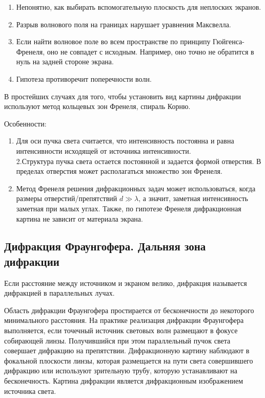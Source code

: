 \begin{enumerate} 
  \item Непонятно, как выбирать вспомогательную плоскость для неплоских экранов.
  
  \item Разрыв волнового поля на границах нарушает уравнения Максвелла.
  
  \item Если найти волновое поле во всем пространстве по принципу Гюйгенса-Френеля, оно не совпадет с исходным. Например, оно точно не обратится в нуль на задней стороне экрана.
  
  \item Гипотеза противоречит поперечности волн.
\end{enumerate}
В простейших случаях для того, чтобы установить вид картины дифракции используют метод кольцевых зон Френеля, спираль Корню. 

Особенности:

\begin{enumerate}
	\item Для оси пучка света считается, что интенсивность постоянна и равна интенсивности исходящей от источника интенсивности.\\ 2.Структура пучка света остается постоянной и задается формой отверстия. В пределах отверстия может располагаться множество зон Френеля. 
	
	\item Метод Френеля решения дифракционных задач может использоваться, когда размеры отверстий/препятствий $d\gg\lambda$, а значит, заметная интенсивность заметная при малых углах. Также, по гипотезе Френеля дифракционная картина не зависит от материала экрана.
\end{enumerate}

\subsection{Дифракция Фраунгофера. Дальняя зона дифракции}

Если расстояние между источником и экраном велико, дифракция называется дифракцией в параллельных лучах.

Область дифракции Фраунгофера простирается от бесконечности до некоторого минимального расстояния. На практике реализация дифракции Фраунгофера выполняется, если точечный источник световых волн размещают в фокусе собирающей линзы. Получившийся при этом параллельный пучок света совершает дифракцию на препятствии. Дифракционную картину наблюдают в фокальной плоскости линзы, которая размещается на пути света совершившего дифракцию или используют зрительную трубу, которую устанавливают на бесконечность. Картина дифракции является дифракционным изображением источника света. 

